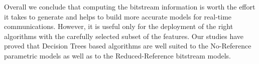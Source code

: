 \documentclass[journal]{IEEEtran}
\begin{document}
Overall we conclude that computing the bitstream information is worth the effort it takes to generate and helps to build more accurate models for real-time communications. However, it is useful only for the deployment of the right algorithms with the carefully selected subset of the features. Our studies have proved that Decision Trees based algorithms are well suited to the No-Reference parametric models as well as to the Reduced-Reference bitstream models.

\vspace{-0.2cm}


%
%



%
%
\end{document}
